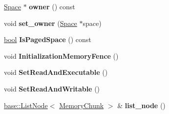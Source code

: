 \begin{DoxyCompactItemize}
\mbox{\hyperlink{classv8_1_1internal_1_1Space}{Space}} $\ast$ {\bfseries owner} () const
\item 
\mbox{\label{classv8_1_1internal_1_1MemoryChunk_a0a951759d40cf006e441bf25aa5f6463}} 
void {\bfseries set\+\_\+owner} (\mbox{\hyperlink{classv8_1_1internal_1_1Space}{Space}} $\ast$space)
\item 
\mbox{\label{classv8_1_1internal_1_1MemoryChunk_a933e7b4c9da28c5b0e8daccd43ead871}} 
\mbox{\hyperlink{classbool}{bool}} {\bfseries Is\+Paged\+Space} () const
\item 
\mbox{\label{classv8_1_1internal_1_1MemoryChunk_a384c8ccf7789e451af42bee4bd7fede0}} 
void {\bfseries Initialization\+Memory\+Fence} ()
\item 
\mbox{\label{classv8_1_1internal_1_1MemoryChunk_a6dbed460d00c2d8f0e6b96e91653a8b3}} 
void {\bfseries Set\+Read\+And\+Executable} ()
\item 
\mbox{\label{classv8_1_1internal_1_1MemoryChunk_a2566689fe669cc9de8cf4fc2bc2ae101}} 
void {\bfseries Set\+Read\+And\+Writable} ()
\item 
\mbox{\label{classv8_1_1internal_1_1MemoryChunk_a3bfd164960fd378e1da7d39731e69516}} 
\mbox{\hyperlink{classv8_1_1base_1_1ListNode}{base\+::\+List\+Node}}$<$ \mbox{\hyperlink{classv8_1_1internal_1_1MemoryChunk}{Memory\+Chunk}} $>$ \& {\bfseries list\+\_\+node} ()
\end{DoxyCompactItemize}
